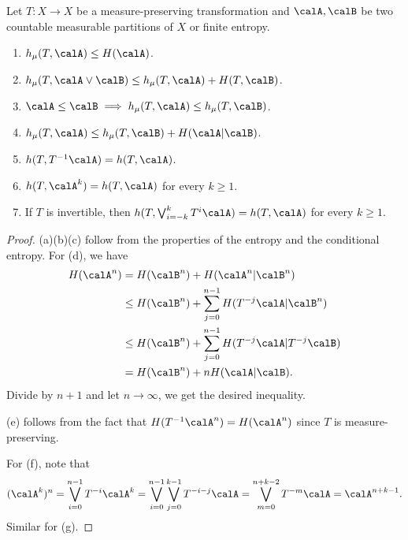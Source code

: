   \begin{proposition}
    Let $T: X \to X$ be a measure-preserving transformation and $\calA, \calB$ be two countable measurable partitions of $X$ or finite entropy. 
    \begin{enumerate}
      \item $h_\mu(T, \calA) \leq H(\calA)$.
      \item $h_\mu(T, \calA \vee \calB) \leq h_\mu(T, \calA) + H(T,\calB)$.
      \item $\calA \leq \calB \implies h_\mu(T, \calA) \leq h_\mu(T, \calB)$.
      \item $h_\mu(T, \calA) \leq h_\mu(T, \calB) + H(\calA | \calB)$.
      \item $h(T, T^{-1} \calA) = h(T, \calA)$.
      \item $h(T, \calA^k) = h(T, \calA)$ for every $k \geq 1$.
      \item If $T$ is invertible, then $h(T, \bigvee_{i=-k}^{k} T^i \calA) = h(T, \calA)$ for every $k \geq 1$.
    \end{enumerate}
  \end{proposition}
  \begin{proof}
    (a)(b)(c) follow from the properties of the entropy and the conditional entropy.
    For (d), we have
    \begin{align*}
      H(\calA^n) & = H(\calB^n) + H(\calA^n | \calB^n) \\
        & \leq H(\calB^n) + \sum_{j=0}^{n-1} H(T^{-j} \calA | \calB^n) \\
        & \leq H(\calB^n) + \sum_{j=0}^{n-1} H(T^{-j} \calA | T^{-j} \calB) \\
        & = H(\calB^n) + n H(\calA | \calB).
    \end{align*}
    Divide by $n+1$ and let $n \to \infty$, we get the desired inequality.

    (e) follows from the fact that $H(T^{-1} \calA^n) = H(\calA^n)$ since $T$ is measure-preserving.

    For (f), note that 
    \[ (\calA^k)^n = \bigvee_{i=0}^{n-1} T^{-i} \calA^k = \bigvee_{i=0}^{n-1} \bigvee_{j=0}^{k-1} T^{-i-j} \calA = \bigvee_{m=0}^{n+k-2} T^{-m} \calA = \calA^{n+k-1}. \]
    Similar for (g).
  \end{proof}

